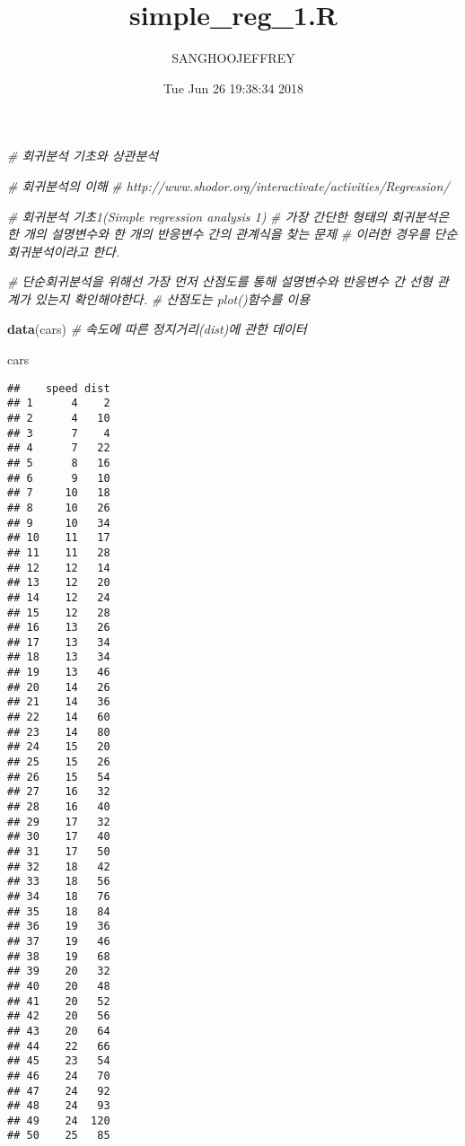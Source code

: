 \documentclass[]{article}
\title{simple\_reg\_1.R}
\author{SANGHOOJEFFREY}
\date{Tue Jun 26 19:38:34 2018}
\newenvironment{Shaded}{\begin{snugshade}}{\end{snugshade}}
\newcommand{\KeywordTok}[1]{\textcolor[rgb]{0.13,0.29,0.53}{\textbf{#1}}}
\newcommand{\CommentTok}[1]{\textcolor[rgb]{0.56,0.35,0.01}{\textit{#1}}}
\newcommand{\OperatorTok}[1]{\textcolor[rgb]{0.81,0.36,0.00}{\textbf{#1}}}
\newcommand{\NormalTok}[1]{#1}
\begin{document}
\maketitle

\begin{Shaded}
\begin{Highlighting}[]
\CommentTok{# 회귀분석 기초와 상관분석}

\CommentTok{# 회귀분석의 이해}
\CommentTok{# http://www.shodor.org/interactivate/activities/Regression/}

\CommentTok{# 회귀분석 기초1(Simple regression analysis 1)}
\CommentTok{# 가장 간단한 형태의 회귀분석은 한 개의 설명변수와 한 개의 반응변수 간의 관계식을 찾는 문제}
\CommentTok{# 이러한 경우를 단순회귀분석이라고 한다. }

\CommentTok{# 단순회귀분석을 위해선 가장 먼저 산점도를 통해 설명변수와 반응변수 간 선형 관계가 있는지 확인해야한다.}
\CommentTok{# 산점도는 plot()함수를 이용}

\KeywordTok{data}\NormalTok{(cars) }\CommentTok{# 속도에 따른 정지거리(dist)에 관한 데이터}

\NormalTok{cars}
\end{Highlighting}
\end{Shaded}

\begin{verbatim}
##    speed dist
## 1      4    2
## 2      4   10
## 3      7    4
## 4      7   22
## 5      8   16
## 6      9   10
## 7     10   18
## 8     10   26
## 9     10   34
## 10    11   17
## 11    11   28
## 12    12   14
## 13    12   20
## 14    12   24
## 15    12   28
## 16    13   26
## 17    13   34
## 18    13   34
## 19    13   46
## 20    14   26
## 21    14   36
## 22    14   60
## 23    14   80
## 24    15   20
## 25    15   26
## 26    15   54
## 27    16   32
## 28    16   40
## 29    17   32
## 30    17   40
## 31    17   50
## 32    18   42
## 33    18   56
## 34    18   76
## 35    18   84
## 36    19   36
## 37    19   46
## 38    19   68
## 39    20   32
## 40    20   48
## 41    20   52
## 42    20   56
## 43    20   64
## 44    22   66
## 45    23   54
## 46    24   70
## 47    24   92
## 48    24   93
## 49    24  120
## 50    25   85
\end{verbatim}

\begin{Shaded}
\end{Shaded}
\end{document}
